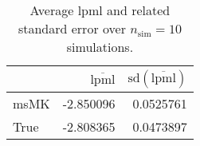 \begin{table}[H]

\caption{Average lpml and related standard error over $n_{\text{sim}} = 10$ simulations.}
\centering
\begin{tabular}[t]{lrr}
\toprule
  & $\overbar{\text{lpml}}$ & $\text{sd}(\overbar{\text{lpml}})$\\
\midrule
msMK & -2.850096 & 0.0525761\\
True & -2.808365 & 0.0473897\\
\bottomrule
\end{tabular}
\end{table}